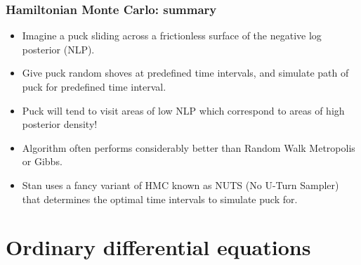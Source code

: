 \documentclass[handout]{beamer}
\begin{document}
\begin{frame}
	\frametitle{Hamiltonian Monte Carlo: summary}
	
	\begin{itemize}
		\item<2-> Imagine a puck sliding across a frictionless surface of the negative log posterior (NLP).
		\item<3-> Give puck random shoves at predefined time intervals, and simulate path of puck for predefined time interval.
		\item<4-> Puck will tend to visit areas of low NLP which correspond to areas of high posterior density!
		\item<5-> Algorithm often performs considerably better than Random Walk Metropolis or Gibbs.
		\item<6-> Stan uses a fancy variant of HMC known as NUTS (No U-Turn Sampler) that determines the optimal time intervals to simulate puck for.
	\end{itemize}
	
\end{frame}


\section{Ordinary differential equations}
\frame{\tableofcontents[currentsection]}
\end{document}
